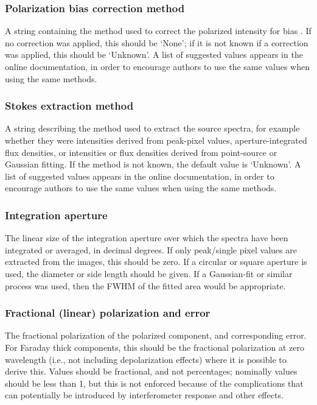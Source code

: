 \documentclass[10pt,modern]{aastex63}
\begin{document}
\subsubsection{Polarization bias correction method}
A string containing the method used to correct the polarized intensity for bias \citep[e.g., ][]{Wardle1974, Simmons1985}. If no correction was applied, this should be `None'; if it is not known if a correction was applied, this should be `Unknown'. A list of suggested values appears in the online documentation, in order to encourage authors to use the same values when using the same methods.

\subsubsection{Stokes extraction method}
A string describing the method used to extract the source spectra, for example whether they were intensities derived from peak-pixel values, aperture-integrated flux densities, or intensities or flux densities derived from point-source or Gaussian fitting. If the method is not known, the default value is `Unknown'. A list of suggested values appears in the online documentation, in order to encourage authors to use the same values when using the same methods.

\subsubsection{Integration aperture}
The linear size of the integration aperture over which the spectra have been integrated or averaged, in decimal degrees. If only peak/single pixel values are extracted from the images, this should be zero. If a circular or square aperture is used, the diameter or side length should be given. If a Gaussian-fit or similar process was used, then the FWHM of the fitted area would be appropriate.


\subsubsection{Fractional (linear) polarization and error}
The fractional polarization of the polarized component, and corresponding error. For Faraday thick components, this should be the fractional polarization at zero wavelength (i.e., not including depolarization effects) where it is possible to derive this. Values should be fractional, and not percentages; nominally values should be less than 1, but this is not enforced because of the complications that can potentially be introduced by interferometer response and other effects.
\end{document}
